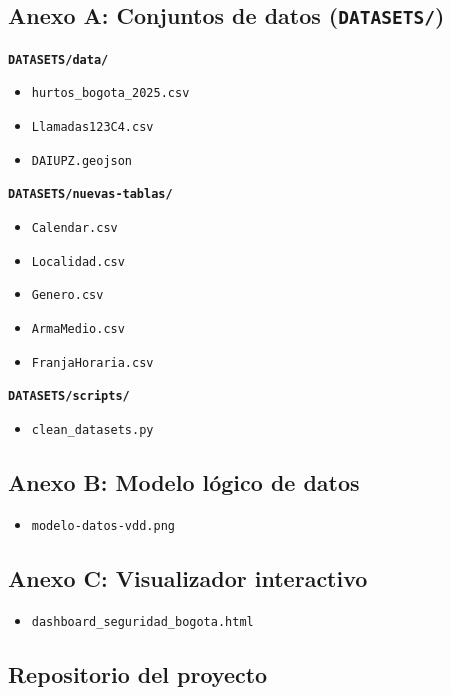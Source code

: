 \documentclass[12pt,letterpaper]{article}
\begin{document}
\subsection{Anexo A: Conjuntos de datos (\texttt{DATASETS/})}

\textbf{\texttt{DATASETS/data/}}
\begin{itemize}[noitemsep, topsep=0pt]
    \item \texttt{hurtos\_bogota\_2025.csv}
    \item \texttt{Llamadas123C4.csv}
    \item \texttt{DAIUPZ.geojson}
\end{itemize}

\textbf{\texttt{DATASETS/nuevas-tablas/}}
\begin{itemize}[noitemsep, topsep=0pt]
    \item \texttt{Calendar.csv}
    \item \texttt{Localidad.csv}
    \item \texttt{Genero.csv}
    \item \texttt{ArmaMedio.csv}
    \item \texttt{FranjaHoraria.csv}
\end{itemize}

\textbf{\texttt{DATASETS/scripts/}}
\begin{itemize}[noitemsep, topsep=0pt]
    \item \texttt{clean\_datasets.py}
\end{itemize}

\subsection{Anexo B: Modelo lógico de datos}

\begin{itemize}[noitemsep, topsep=0pt]
    \item \texttt{modelo-datos-vdd.png}
\end{itemize}

\subsection{Anexo C: Visualizador interactivo}

\begin{itemize}[noitemsep, topsep=0pt]
    \item \texttt{dashboard\_seguridad\_bogota.html}
\end{itemize}

\subsection{Repositorio del proyecto}
\end{document}
